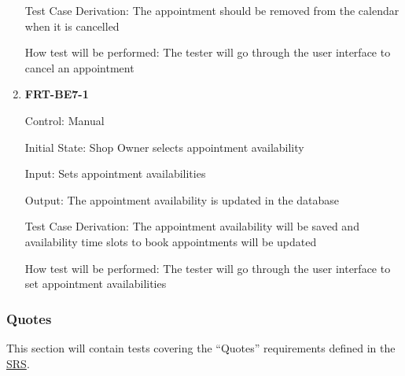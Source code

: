 \documentclass[12pt, titlepage]{article}
\begin{document}
\begin{enumerate}
	      Test Case Derivation: The appointment should be removed from the calendar when it is cancelled

	      How test will be performed: The tester will go through the user interface to cancel an appointment

	\item \textbf{FRT-BE7-1}

	      Control: Manual

	      Initial State: Shop Owner selects appointment availability

	      Input: Sets appointment availabilities

	      Output: The appointment availability is updated in the database

	      Test Case Derivation: The appointment availability will be saved and availability time slots to
	      book appointments will be updated

	      How test will be performed: The tester will go through the user interface to set appointment
	      availabilities
\end{enumerate}

\subsubsection{Quotes}

This section will contain tests covering the ``Quotes'' requirements defined in the
\href{https://github.com/arkinmodi/project-sayyara/blob/main/docs/SRS/SRS.pdf}{SRS}.
\end{document}

